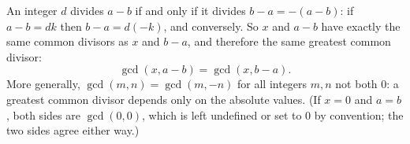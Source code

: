An integer $d$ divides $a-b$ if and only if it divides $b-a=-(a-b)$: if $a-b=dk$ then $b-a=d(-k)$, and conversely. So $x$ and $a-b$ have exactly the same common divisors as $x$ and $b-a$, and therefore the same greatest common divisor:
\[
\boxed{\gcd(x,a-b)=\gcd(x,b-a)}.
\]
More generally, $\gcd(m,n)=\gcd(m,-n)$ for all integers $m,n$ not both $0$: a greatest common divisor depends only on the absolute values. (If $x=0$ and $a=b$, both sides are $\gcd(0,0)$, which is left undefined or set to $0$ by convention; the two sides agree either way.)
